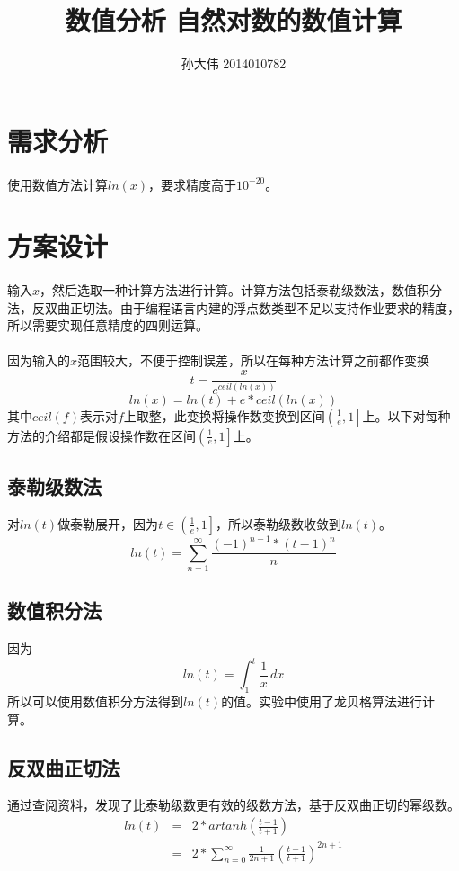 \documentclass[UTF8,twocolum,titlepage]{ctexart}
\title{数值分析 自然对数的数值计算}
\author{孙大伟 2014010782}
\date{}
\begin{document}
\maketitle
\boldmath
\section*{需求分析}
\paragraph{}
使用数值方法计算$ln\left(x\right)$，要求精度高于$10^{-20}$。
\section*{方案设计}
\paragraph{}
输入$x$，然后选取一种计算方法进行计算。计算方法包括泰勒级数法，数值积分法，反双曲正切法。由于编程语言内建的浮点数类型不足以支持作业要求的精度，所以需要实现任意精度的四则运算。
\paragraph{}
因为输入的$x$范围较大，不便于控制误差，所以在每种方法计算之前都作变换$$t=\frac{x}{e^{ceil\left(ln\left(x\right)\right)}}$$ $$ln\left(x\right)=ln\left(t\right)+e*ceil\left(ln\left(x\right)\right)$$其中$ceil\left(f\right)$表示对$f$上取整，此变换将操作数变换到区间$\left(\frac{1}{e},1 \right]$上。以下对每种方法的介绍都是假设操作数在区间$\left(\frac{1}{e},1 \right]$上。
\subsection*{泰勒级数法}
对$ln\left(t\right)$做泰勒展开，因为$t\in\left(\frac{1}{e},1 \right]$，所以泰勒级数收敛到$ln\left(t\right)$。
$$ln\left(t\right)=\sum\limits_{n=1}^{\infty}\frac{\left(-1\right)^{n-1}*\left(t-1\right)^{n}}{n}$$
\subsection*{数值积分法}
因为$$ln\left(t\right)=\int_1^t \frac{1}{x}\,dx$$所以可以使用数值积分方法得到$ln\left(t\right)$的值。实验中使用了龙贝格算法进行计算。
\subsection*{反双曲正切法}
通过查阅资料，发现了比泰勒级数更有效\cite{Logarithm_Wikipedia}的级数方法，基于反双曲正切的幂级数。
\begin{eqnarray*}
ln\left(t\right) &=&2*artanh\left(\frac{t-1}{t+1}\right)\\&=&2*\sum_{n=0}^{\infty}\frac{1}{2n+1}\left(\frac{t-1}{t+1}\right)^{2n+1}
\end{eqnarray*}
\end{document}
